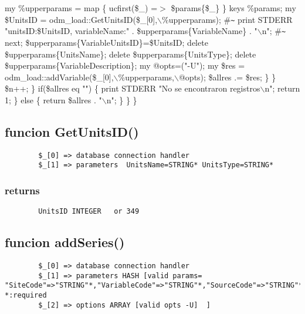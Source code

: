 \documentclass{article}
\begin{document}
					my \%upperparams = map \{ ucfirst(\$\_) =$>$ \$params\{\$\_\} \} keys \%params;
					my \$UnitsID = odm\_load::GetUnitsID(\$\_[0],$\backslash$\%upperparams);
					\#\texttt{\~{}} print STDERR "unitsID:\$UnitsID, variableName:" . \$upperparams\{VariableName\} . "$\backslash$n";
					\#\texttt{\~{}} next;
					\$upperparams\{VariableUnitsID\}=\$UnitsID;
					delete \$upperparams\{UnitsName\};
					delete \$upperparams\{UnitsType\};
					delete \$upperparams\{VariableDescription\};
					my @opts=("-U");
					my \$res = odm\_load::addVariable(\$\_[0],$\backslash$\%upperparams,$\backslash$@opts);
					\$allres .= \$res;
				\}
			\}
			\$n++;
		\}
		if(\$allres eq "") \{ 
			print STDERR "No se encontraron registros$\backslash$n";
			return 1;
		\} else \{
			return \$allres . "$\backslash$n";
		\} 
	\}
\}

\subsection*{funcion GetUnitsID()\label{funcion_GetUnitsID_}}
\begin{verbatim}
        $_[0] => database connection handler
        $_[1] => parameters  UnitsName=STRING* UnitsType=STRING*
\end{verbatim}
\subsubsection*{returns\label{returns}}
\begin{verbatim}
        UnitsID INTEGER   or 349
\end{verbatim}
\subsection*{funcion addSeries()\label{funcion_addSeries_}}
\begin{verbatim}
        $_[0] => database connection handler
        $_[1] => parameters HASH [valid params=  "SiteCode"=>"STRING"*,"VariableCode"=>"STRING"*,"SourceCode"=>"STRING"*,"MethodCode"=>"STRING","MethodDescription"=>"STRING","MethodLink"=>"STRING","Organization"=>"STRING","SourceDescription"=>"STRING","citation"=>"STRING","qualityControlLevelCode"=>"STRING","qualityControlLevelDefinition"=>"STRING","valueCount"=>"INTEGER","beginDateTime"=>"STRING","endDateTime"=>"STRING","beginDateTimeUTC"=>"STRING","endDateTimeUTC"=>"STRING"       *:required
        $_[2] => options ARRAY [valid opts -U]  ]
\end{verbatim}
\end{document}
